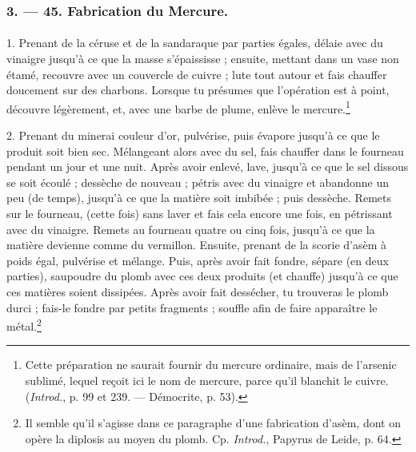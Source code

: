 \documentclass[a4paper, 11pt, oneside, polutonikogreek, french]{article}
\begin{document}
\bigskip
\centerline{\EightStarTaper}
\centerline{\EightStarTaper\EightStarTaper}
\bigskip

\subsubsection{3. --- 45. Fabrication du Mercure.}
\paragraph{}
1. Prenant de la céruse et de la sandaraque par parties égales, délaie avec du vinaigre jusqu'à ce que la masse s'épaississe ; ensuite, mettant dans un vase non étamé, recouvre avec un couvercle de cuivre ; lute tout autour et fais chauffer doucement sur des charbons. Lorsque tu présumes que l'opération est à point, découvre légèrement, et, avec une barbe de plume, enlève le mercure.\footnote{Cette préparation ne saurait fournir du mercure ordinaire, mais de l'arsenic sublimé, lequel reçoit ici le nom de mercure, parce qu'il blanchit le cuivre. (\emph{Introd.}, p. 99 et 239. --- Démocrite, p. 53).}

2. Prenant du minerai couleur d'or, pulvérise, puis évapore jusqu'à ce que le produit soit bien sec. Mélangeant alors avec du sel, fais chauffer dans le fourneau pendant un jour et une nuit. Après avoir enlevé, lave, jusqu'à ce que le sel dissous se soit écoulé ; dessèche de nouveau ; pétris avec du vinaigre et abandonne un peu (de temps), jusqu'à ce que la matière soit imbibée ; puis dessèche. Remets sur le fourneau, (cette fois) sans laver et fais cela encore une fois, en pétrissant avec du vinaigre. Remets au fourneau quatre ou cinq fois, jusqu'à ce que la matière devienne comme du vermillon. Ensuite, prenant de la scorie d'asèm à poids égal, pulvérise et mélange. Puis, après avoir fait fondre, sépare (en deux parties), saupoudre du plomb avec ces deux produits (et chauffe) jusqu'à ce que ces matières soient dissipées. Après avoir fait dessécher, tu trouveras le plomb durci ; fais-le fondre par petits fragments ; souffle afin de faire apparaître le métal.\footnote{Il semble qu'il s'agisse dans ce paragraphe d'une fabrication d'asèm, dont on opère la diplosis au moyen du plomb. Cp. \emph{Introd.}, Papyrus de Leide, p. 64.}
\end{document}
